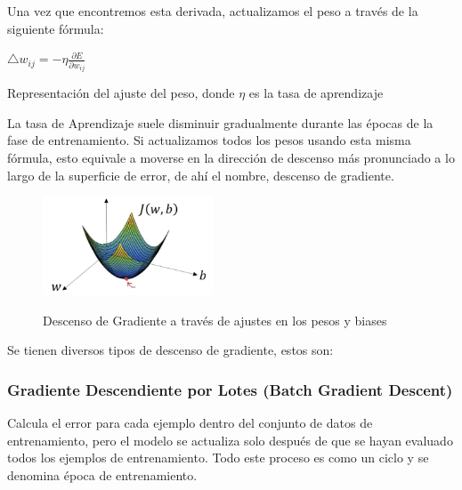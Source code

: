 		Una vez que encontremos esta derivada, actualizamos el peso a través de la siguiente fórmula:

		\begingroup\makeatletter{}\check@mathfonts
		\begin{center}
		$  \triangle w_{ij} = -\eta\frac{{\partial E}}{\partial w_{ij}} $
		\end{center}
		\begin{center}
		{\small{Representación del ajuste del peso, donde $\eta$ es la tasa de aprendizaje}}
		\end{center}
		\endgroup

		La tasa de Aprendizaje suele disminuir gradualmente durante las épocas de la fase de entrenamiento. Si actualizamos todos los pesos usando esta misma fórmula, esto equivale a moverse en la dirección de descenso más pronunciado a lo largo de la superficie de error, de ahí el nombre, descenso de gradiente.
		\begin{figure}[H]
		\begin{center}
		\includegraphics[width=0.45\textwidth]{images/desarrollo/entrenamiento/gradient}
		\end{center}
		\begin{center}
		\caption{\small{Descenso de Gradiente a través de ajustes en los pesos y biases}}
		\vspace{-0.5em}
		{\small{\cite{gradientimg}}}
		\end{center}
		\vspace{-1.5em}
		\end{figure}

		Se tienen diversos tipos de descenso de gradiente, estos son:
		\subsubsection{Gradiente Descendiente por Lotes (Batch Gradient Descent)}
		
			Calcula el error para cada ejemplo dentro del conjunto de datos de entrenamiento, pero el modelo se actualiza solo después de que se hayan evaluado todos los ejemplos de entrenamiento. Todo este proceso es como un ciclo y se denomina época de entrenamiento.

